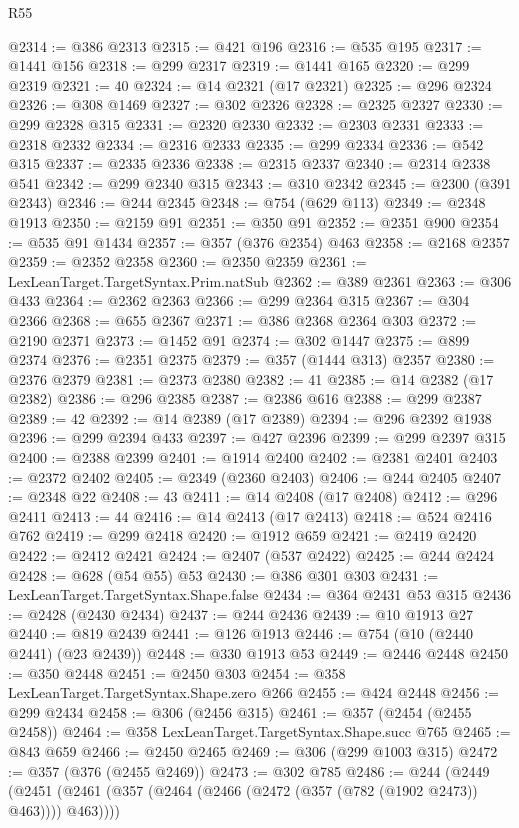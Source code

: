 \begin{lexlean}{R55}
\begin{coremodule}
@2314 := @386 @2313
@2315 := @421 @196
@2316 := @535 @195
@2317 := @1441 @156
@2318 := @299 @2317
@2319 := @1441 @165
@2320 := @299 @2319
@2321 := 40
@2324 := @14 @2321 (@17 @2321)
@2325 := @296 @2324
@2326 := @308 @1469
@2327 := @302 @2326
@2328 := @2325 @2327
@2330 := @299 @2328 @315
@2331 := @2320 @2330
@2332 := @2303 @2331
@2333 := @2318 @2332
@2334 := @2316 @2333
@2335 := @299 @2334
@2336 := @542 @315
@2337 := @2335 @2336
@2338 := @2315 @2337
@2340 := @2314 @2338 @541
@2342 := @299 @2340 @315
@2343 := @310 @2342
@2345 := @2300 (@391 @2343)
@2346 := @244 @2345
@2348 := @754 (@629 @113)
@2349 := @2348 @1913
@2350 := @2159 @91
@2351 := @350 @91
@2352 := @2351 @900
@2354 := @535 @91 @1434
@2357 := @357 (@376 @2354) @463
@2358 := @2168 @2357
@2359 := @2352 @2358
@2360 := @2350 @2359
@2361 := LexLeanTarget.TargetSyntax.Prim.natSub
@2362 := @389 @2361
@2363 := @306 @433
@2364 := @2362 @2363
@2366 := @299 @2364 @315
@2367 := @304 @2366
@2368 := @655 @2367
@2371 := @386 @2368 @2364 @303
@2372 := @2190 @2371
@2373 := @1452 @91
@2374 := @302 @1447
@2375 := @899 @2374
@2376 := @2351 @2375
@2379 := @357 (@1444 @313) @2357
@2380 := @2376 @2379
@2381 := @2373 @2380
@2382 := 41
@2385 := @14 @2382 (@17 @2382)
@2386 := @296 @2385
@2387 := @2386 @616
@2388 := @299 @2387
@2389 := 42
@2392 := @14 @2389 (@17 @2389)
@2394 := @296 @2392 @1938
@2396 := @299 @2394 @433
@2397 := @427 @2396
@2399 := @299 @2397 @315
@2400 := @2388 @2399
@2401 := @1914 @2400
@2402 := @2381 @2401
@2403 := @2372 @2402
@2405 := @2349 (@2360 @2403)
@2406 := @244 @2405
@2407 := @2348 @22
@2408 := 43
@2411 := @14 @2408 (@17 @2408)
@2412 := @296 @2411
@2413 := 44
@2416 := @14 @2413 (@17 @2413)
@2418 := @524 @2416 @762
@2419 := @299 @2418
@2420 := @1912 @659
@2421 := @2419 @2420
@2422 := @2412 @2421
@2424 := @2407 (@537 @2422)
@2425 := @244 @2424
@2428 := @628 (@54 @55) @53
@2430 := @386 @301 @303
@2431 := LexLeanTarget.TargetSyntax.Shape.false
@2434 := @364 @2431 @53 @315
@2436 := @2428 (@2430 @2434)
@2437 := @244 @2436
@2439 := @10 @1913 @27
@2440 := @819 @2439
@2441 := @126 @1913
@2446 := @754 (@10 (@2440 @2441) (@23 @2439))
@2448 := @330 @1913 @53
@2449 := @2446 @2448
@2450 := @350 @2448
@2451 := @2450 @303
@2454 := @358 LexLeanTarget.TargetSyntax.Shape.zero @266
@2455 := @424 @2448
@2456 := @299 @2434
@2458 := @306 (@2456 @315)
@2461 := @357 (@2454 (@2455 @2458))
@2464 := @358 LexLeanTarget.TargetSyntax.Shape.succ @765
@2465 := @843 @659
@2466 := @2450 @2465
@2469 := @306 (@299 @1003 @315)
@2472 := @357 (@376 (@2455 @2469))
@2473 := @302 @785
@2486 := @244
    (@2449 (@2451 (@2461 (@357 (@2464 (@2466 (@2472 (@357 (@782 (@1902 @2473)) @463)))) @463))))

\end{coremodule}
\end{lexlean}
